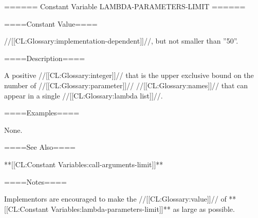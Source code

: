 ====== Constant Variable LAMBDA-PARAMETERS-LIMIT ======

====Constant Value====

//[[CL:Glossary:implementation-dependent]]//, but not smaller than ''50''.

====Description====

A positive //[[CL:Glossary:integer]]// that is the upper exclusive bound on the number of //[[CL:Glossary:parameter]]// //[[CL:Glossary:names]]// that can appear in a single //[[CL:Glossary:lambda list]]//.

====Examples====

None.

====See Also====

**[[CL:Constant Variables:call-arguments-limit]]**

====Notes====

Implementors are encouraged to make the //[[CL:Glossary:value]]// of **[[CL:Constant Variables:lambda-parameters-limit]]** as large as possible.

